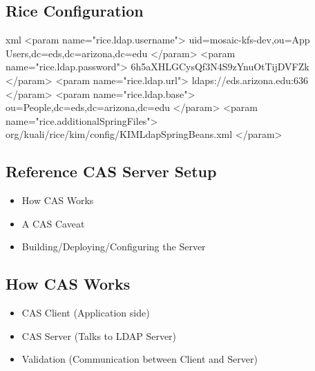 \documentclass[12pt,notitlepage]{article}
\begin{document}
\begin{s5presentation}
%
%
  \W \begin{s5slide}
    \section{Rice Configuration}
\begin{code}{xml}
<param name="rice.ldap.username">
    uid=mosaic-kfs-dev,ou=App Users,dc=eds,dc=arizona,dc=edu
</param>
<param name="rice.ldap.password">
    6h5aXHLGCysQf3N4S9zYnuOtTijDVFZk
</param>
<param name="rice.ldap.url">
    ldaps://eds.arizona.edu:636
</param>
<param name="rice.ldap.base">
    ou=People,dc=eds,dc=arizona,dc=edu
</param>
<param name="rice.additionalSpringFiles">
    org/kuali/rice/kim/config/KIMLdapSpringBeans.xml
</param>
  \end{code}
    \W \end{s5slide}

%
%
  \W \begin{s5slide}
    \section{Reference CAS Server Setup}
    \begin{itemize}
      \item How CAS Works
      \item A CAS Caveat
      \item Building/Deploying/Configuring the Server
      \end{itemize}
    
    \W \end{s5slide}

%
%
  \W \begin{s5slide}
    \section{How CAS Works}
    \begin{itemize}
      \item CAS Client (Application side)
      \item CAS Server (Talks to LDAP Server)
      \item Validation (Communication between Client and Server)
      \end{itemize}
    
    \W \end{s5slide}


\end{s5presentation}
\end{document}
